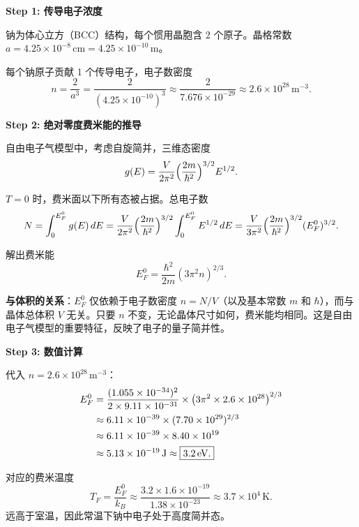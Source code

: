 \begin{derivationbox}[标准解题过程]
\textbf{Step 1: 传导电子浓度}

钠为体心立方（BCC）结构，每个惯用晶胞含 2 个原子。晶格常数 $a=4.25\times10^{-8}\,\text{cm}=4.25\times10^{-10}\,\text{m}$。

每个钠原子贡献 1 个传导电子，电子数密度
\begin{equation}
n=\frac{2}{a^3}=\frac{2}{(4.25\times10^{-10})^3}
\approx\frac{2}{7.676\times10^{-29}}
\approx\boxed{2.6\times10^{28}\,\text{m}^{-3}.}
\end{equation}

\textbf{Step 2: 绝对零度费米能的推导}

自由电子气模型中，考虑自旋简并，三维态密度
\begin{equation}
g(E)=\frac{V}{2\pi^2}\Bigl(\frac{2m}{\hbar^2}\Bigr)^{3/2}E^{1/2}.
\end{equation}

$T=0$ 时，费米面以下所有态被占据。总电子数
\begin{equation}
N=\int_0^{E_F^0}g(E)\,dE
=\frac{V}{2\pi^2}\Bigl(\frac{2m}{\hbar^2}\Bigr)^{3/2}\int_0^{E_F^0}E^{1/2}\,dE
=\frac{V}{3\pi^2}\Bigl(\frac{2m}{\hbar^2}\Bigr)^{3/2}(E_F^0)^{3/2}.
\end{equation}

解出费米能
\begin{equation}
\boxed{E_F^0=\frac{\hbar^2}{2m}(3\pi^2n)^{2/3}.}
\end{equation}

\textbf{与体积的关系}：$E_F^0$ 仅依赖于电子数密度 $n=N/V$（以及基本常数 $m$ 和 $\hbar$），而与晶体总体积 $V$ 无关。只要 $n$ 不变，无论晶体尺寸如何，费米能均相同。这是自由电子气模型的重要特征，反映了电子的量子简并性。

\textbf{Step 3: 数值计算}

代入 $n=2.6\times10^{28}\,\text{m}^{-3}$：
\begin{align}
E_F^0&=\frac{(1.055\times10^{-34})^2}{2\times9.11\times10^{-31}}\times\bigl(3\pi^2\times2.6\times10^{28}\bigr)^{2/3} \notag\\
&\approx6.11\times10^{-39}\times(7.70\times10^{29})^{2/3} \notag\\
&\approx6.11\times10^{-39}\times8.40\times10^{19} \notag\\
&\approx5.13\times10^{-19}\,\text{J}\approx\boxed{3.2\,\text{eV}.}
\end{align}

对应的费米温度
\begin{equation}
T_F=\frac{E_F^0}{k_B}\approx\frac{3.2\times1.6\times10^{-19}}{1.38\times10^{-23}}\approx3.7\times10^4\,\text{K}.
\end{equation}
远高于室温，因此常温下钠中电子处于高度简并态。
\end{derivationbox}

